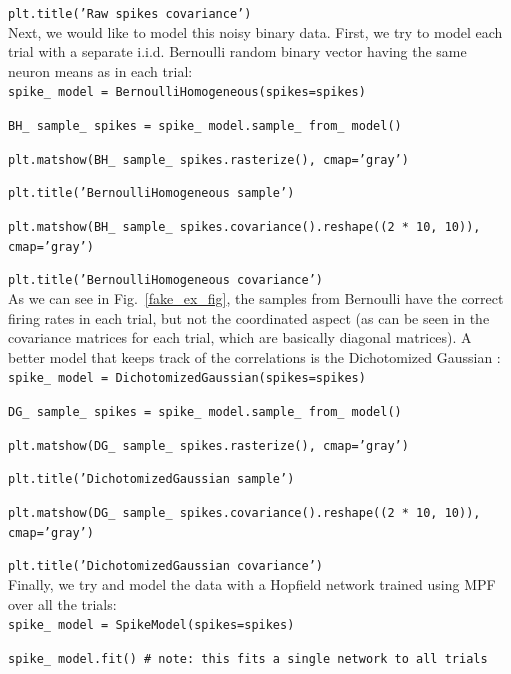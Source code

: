 \documentclass[letter, 12pt]{article}
\theoremstyle{definition}
\theoremstyle{remark}
\begin{document}
\texttt{plt.title('Raw spikes covariance')}  \\

Next, we would like to model this noisy binary data.   First, we try to model each trial with a separate i.i.d. Bernoulli random binary vector having the same neuron means as in each trial:  \\

\texttt{spike\_\,model = BernoulliHomogeneous(spikes=spikes)}

\texttt{BH\_\,sample\_\,spikes = spike\_\,model.sample\_\,from\_\,model()}

\texttt{plt.matshow(BH\_\,sample\_\,spikes.rasterize(), cmap='gray')}

\texttt{plt.title('BernoulliHomogeneous sample')}

\texttt{plt.matshow(BH\_\,sample\_\,spikes.covariance().reshape((2 * 10, 10)), cmap='gray')}

\texttt{plt.title('BernoulliHomogeneous covariance')} \\

As we can see in Fig.~\ref{fake_ex_fig}, the samples from Bernoulli have the correct firing rates in each trial, but not the coordinated aspect (as can be seen in the covariance matrices for each trial, which are basically diagonal matrices).   A better model that keeps track of the correlations is the Dichotomized Gaussian \cite{bethge2008}: \\

\texttt{spike\_\,model = DichotomizedGaussian(spikes=spikes)}

\texttt{DG\_\,sample\_\,spikes = spike\_\,model.sample\_\,from\_\,model()}

\texttt{plt.matshow(DG\_\,sample\_\,spikes.rasterize(), cmap='gray')}

\texttt{plt.title('DichotomizedGaussian sample')}

\texttt{plt.matshow(DG\_\,sample\_\,spikes.covariance().reshape((2 * 10, 10)), cmap='gray')}

\texttt{plt.title('DichotomizedGaussian covariance')} \\


Finally, we try and model the data with a Hopfield network trained using MPF over all the trials:  \\

\texttt{spike\_\,model = SpikeModel(spikes=spikes)}

\texttt{spike\_\,model.fit()  \# note: this fits a single network to all trials}
\end{document}
